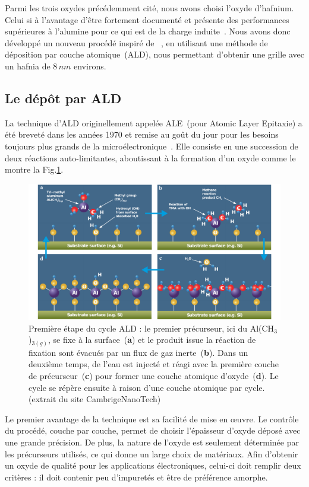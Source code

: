 Parmi les trois oxydes précédemment cité, nous avons choisi l'oxyde d'hafnium. Celui si à l'avantage d'être fortement documenté et présente des performances supérieures à l'alumine pour ce qui est de la charge induite~\cite{Biercuk2003}. Nous avons donc développé un nouveau procédé inspiré de~\cite{Biercuk2003} , en utilisant une méthode de déposition par couche atomique~(ALD), nous permettant d'obtenir une grille avec un hafnia de $8\,nm$ environs.




\subsection{Le dép\^ot par ALD}
La technique d'ALD originellement appelée ALE~(pour Atomic Layer Epitaxie) a été breveté dans les années 1970 et remise au goût du jour pour les besoins toujours plus grands de la microélectronique~\cite{Leskelae2003}. Elle consiste en une succession de deux réactions auto-limitantes, aboutissant à la formation d'un oxyde comme le montre la Fig.\ref{ALD}.

\begin{figure}
\centering \includegraphics[scale=0.45]{Fabrication/ALD/ALD.pdf}
\caption{Première étape du cycle ALD : le premier précurseur, ici du Al(CH$_3$)$_{3(g)}$, se fixe à la surface~(\textbf{a}) et le produit issue la réaction de fixation sont évacués par un flux de gaz inerte~(\textbf{b}). Dans un deuxième temps, de l'eau est injecté et réagi avec la première couche de précurseur~(\textbf{c}) pour former une couche atomique d'oxyde~(\textbf{d}). Le cycle se répère ensuite à raison d'une couche atomique par cycle. (extrait du site CambrigeNanoTech)}
\label{ALD}
\end{figure}


Le premier avantage de la technique est sa facilité de mise en œuvre. Le contrôle du procédé, couche par couche, permet de choisir l'épaisseur d'oxyde déposé avec une grande précision. De plus, la nature de l'oxyde est seulement déterminée par les précurseurs utilisés, ce qui donne un large choix de matériaux. Afin d'obtenir un oxyde de qualité pour les applications électroniques, celui-ci doit remplir deux critères : il doit contenir peu d'impuretés et être de préférence amorphe.

